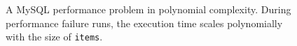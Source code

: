 \begin{figure}
\centering
\scriptsize
{}
  \mbox{}
  \vspace{-0.1in}
  {A MySQL performance problem in polynomial complexity.}
  {During performance failure runs, 
  the execution time scales polynomially with the size of \texttt{items}.}
\end{figure}